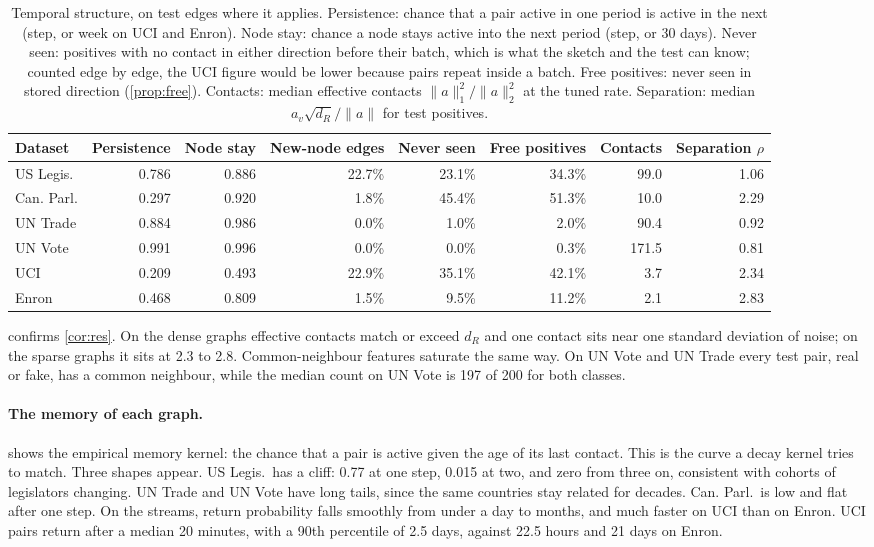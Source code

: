 \documentclass[11pt,a4paper]{article}
\theoremstyle{plain}
\theoremstyle{definition}
\begin{document}
\begin{table}[H]\centering\small\setlength{\tabcolsep}{4pt}
\begin{tabular}{lrrrrrrr}
\toprule
Dataset & Persistence & Node stay & New-node edges & Never seen & Free positives & Contacts & Separation $\rho$\\
\midrule
US Legis. & 0.786 & 0.886 & 22.7\% & 23.1\% & 34.3\% & 99.0 & 1.06\\
Can. Parl. & 0.297 & 0.920 & 1.8\% & 45.4\% & 51.3\% & 10.0 & 2.29\\
UN Trade & 0.884 & 0.986 & 0.0\% & 1.0\% & 2.0\% & 90.4 & 0.92\\
UN Vote & 0.991 & 0.996 & 0.0\% & 0.0\% & 0.3\% & 171.5 & 0.81\\
UCI & 0.209 & 0.493 & 22.9\% & 35.1\% & 42.1\% & 3.7 & 2.34\\
Enron & 0.468 & 0.809 & 1.5\% & 9.5\% & 11.2\% & 2.1 & 2.83\\
\bottomrule
\end{tabular}
\caption{Temporal structure, on test edges where it applies. Persistence: chance that a pair active in one period is active in the next (step, or week on UCI and Enron). Node stay: chance a node stays active into the next period (step, or 30 days). Never seen: positives with no contact in either direction before their batch, which is what the sketch and the test can know; counted edge by edge, the UCI figure would be lower because pairs repeat inside a batch. Free positives: never seen in stored direction (\cref{prop:free}). Contacts: median effective contacts $\|a\|_1^2/\|a\|_2^2$ at the tuned rate. Separation: median $a_v\sqrt{d_R}/\|a\|$ for test positives.}\label{tab:temporal}
\end{table}

 confirms \cref{cor:res}. On the dense graphs effective contacts match or exceed $d_R$ and one contact sits near one standard deviation of noise; on the sparse graphs it sits at 2.3 to 2.8. Common-neighbour features saturate the same way. On UN Vote and UN Trade every test pair, real or fake, has a common neighbour, while the median count on UN Vote is 197 of 200 for both classes.

\paragraph{The memory of each graph.}  shows the empirical memory kernel: the chance that a pair is active given the age of its last contact. This is the curve a decay kernel tries to match. Three shapes appear. US Legis.\ has a cliff: 0.77 at one step, 0.015 at two, and zero from three on, consistent with cohorts of legislators changing. UN Trade and UN Vote have long tails, since the same countries stay related for decades. Can. Parl.\ is low and flat after one step. On the streams, return probability falls smoothly from under a day to months, and much faster on UCI than on Enron. UCI pairs return after a median 20 minutes, with a 90th percentile of 2.5 days, against 22.5 hours and 21 days on Enron.
\end{document}
